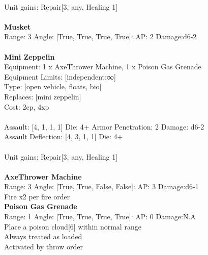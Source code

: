\ \\
Unit gains: Repair[3, any, Healing 1]\\ 

\ \\
{\bf Musket } \\



Range: 3  Angle: [True, True, True, True]: AP: 2 Damage:d6-2 \\




 
\ \\

{\bf Mini Zeppelin } \\
Equipment: 1 x AxeThrower Machine, 1 x Poison Gas Grenade \\
Equipment Limits: [independent:∞] \\
Type: [open vehicle, floats, bio] \\
Replaces: [mini zeppelin] \\
Cost: 2cp, 4xp\\
\ \\
Assault: [4, 1, 1, 1] Die: 4+ Armor Penetration: 2 Damage: d6-2 \\
Assault Deflection: [4, 3, 1, 1] Die: 4+\\
\indent  
\ \\
Unit gains: Repair[3, any, Healing 1]\\ 

\ \\
{\bf AxeThrower Machine } \\



Range: 3  Angle: [True, True, False, False]: AP: 3 Damage:d6-1 \\
Fire x2 per fire order\\ 




{\bf Poison Gas Grenade } \\



Range: 1  Angle: [True, True, True, True]: AP: 0 Damage:N.A \\
Place a poison cloud[6] within normal range\\ 
Always treated as loaded\\ 
Activated by throw order\\ 




 
\ \\

